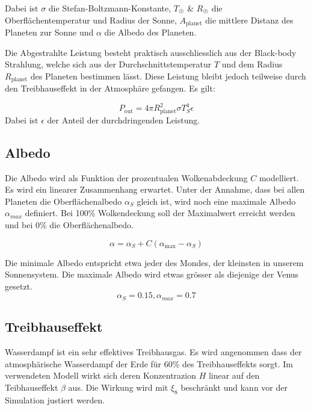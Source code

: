 \begin{refsection}
Dabei ist $\sigma$ die Stefan-Boltzmann-Konstante, $T_{\astrosun}$ \& $R_{\astrosun}$ die Oberflächentemperatur und Radius der Sonne, $ A_{\text{planet}}$ die mittlere Distanz des Planeten zur Sonne und $\alpha$ die Albedo des Planeten.

Die Abgestrahlte Leistung besteht praktisch ausschliesslich aus der Black-body Strahlung, welche sich aus der Durchschnittstemperatur $T$ und dem Radius $R_{\text{planet}}$ des Planeten bestimmen lässt. Diese Leistung bleibt jedoch teilweise durch den Treibhauseffekt in der Atmosphäre gefangen. Es gilt: 

\begin{equation}
P_{\text{out}} = 4 \pi R_{\text{planet}}^2 \sigma T_{S}^4 \epsilon
\end{equation}
Dabei ist $\epsilon$ der Anteil der durchdringenden Leistung.



\subsection{Albedo}

Die Albedo wird als Funktion der prozentualen Wolkenabdeckung $C$ modelliert. Es wird ein linearer Zusammenhang erwartet. Unter der Annahme, dass bei allen Planeten die Oberflächenalbedo $\alpha_{S}$ gleich ist, wird noch eine maximale Albedo $\alpha_{max}$ definiert. Bei 100\% Wolkendeckung soll der Maximalwert erreicht werden und bei 0\% die Oberflächenalbedo.

\begin{equation}
\alpha = \alpha_S + C(\alpha_{\text{max}} - \alpha_S)
\end{equation}

Die minimale Albedo entspricht etwa jeder des Mondes, der kleinsten in unserem Sonnensystem. Die maximale Albedo wird etwas grösser als diejenige der Venus gesetzt.
\begin{equation}
\alpha_S = 0.15, \alpha_{max} = 0.7
\end{equation}

\subsection{Treibhauseffekt}

Wasserdampf ist ein sehr effektives Treibhausgas. Es wird angenommen dass der atmosphärische Wasserdampf der Erde für 60\% des Treibhauseffekts sorgt.  
Im verwendeten Modell wirkt sich deren Konzentrazion $H$ linear auf den Teibhauseffekt $\beta$ aus. Die Wirkung wird mit $\xi_8$ beschränkt und kann vor der Simulation justiert werden.


\end{refsection}
